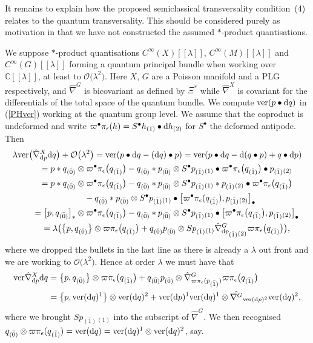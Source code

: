 \documentclass[pdftex]{sigma}
\numberwithin{equation}{section}
\newcommand{\C}{{\mathbb{C}}}
\newcommand{\<}{{\langle}}
\renewcommand{\>}{{\rangle}}
\newcommand{\tens}{\otimes}
\renewcommand{\o}{{}_{\scriptstyle(1)}}
\renewcommand{\t}{{}_{\scriptstyle(2)}}
\newcommand{\extd}{{\rm d}}
\newcommand{\eps}{\epsilon}
\newcommand{\co}{{}_{\scriptstyle \bar{(1)}}}
\newcommand{\rz}{{}_{\scriptstyle \bar{(0)}}}
\begin{document}
It remains to explain how the proposed semiclassical transversality condition~(4) relates to the quantum transversality. This should be considered purely as motivation in that we have not constructed the assumed $*$-product quantisations.

\begin{Remark}\label{defbunrem} We suppose $*$-product quantisations $C^\infty(X)[[\lambda]]$, $C^\infty(M)[[\lambda]]$ and $C^\infty(G)[[\lambda]]$ forming a quantum principal bundle when working over $\C[[\lambda]]$, at least to $\mathcal{O}\big(\lambda^2\big)$. Here $X$, $G$ are a Poisson manifold and a PLG respectively, and $\hat\nabla^G$ is bicovariant as defined by $\Xi^*$ while $\hat\nabla^X$ is covariant for the differentials of the total space of the quantum bundle. We compute $\text{ver}(p\bullet\extd q)$ in (\ref{PHver}) working at the quantum group level. We assume that the coproduct is undeformed and write $\varpi^\bullet\pi_\eps(h)=S^\bullet h\o\bullet \extd h\t$ for $S^\bullet$ the deformed antipode. Then
\begin{gather*} \lambda\text{ver}\big(\hat{\nabla}^X_{\extd p}\extd q\big) +\mathcal{O}\big(\lambda^2\big)=\text{ver}(p\bullet\extd q-(\extd q)\bullet p)=\text{ver}(p\bullet\extd q-\extd(q\bullet p)+q\bullet \extd p)\\
\qquad{} = p* q\rz \tens \varpi^\bullet\pi_\eps\big(q\co\big)-q\rz * p\rz \tens S^\bullet p\co\o \bullet \varpi^\bullet\pi_\eps\big(q\co\big)\bullet p\co\t \\
\qquad{} = p* q\rz \tens \varpi^\bullet\pi_\eps\big(q\co\big)-q\rz * p\rz \tens S^\bullet p\co\o * p\co\t\bullet \varpi^\bullet\pi_\eps\big(q\co\big) \\
\qquad\quad{} -q\rz * p\rz \tens S^\bullet p\co\o \bullet\big[ \varpi^\bullet\pi_\eps(q\co),p\co\t\big]_\bullet\\
\qquad{} = \big[p,q\rz\big]_*\tens \varpi^\bullet\pi_\eps\big(q\co\big) -q\rz * p\rz \tens S^\bullet p\co\o \bullet\big[ \varpi^\bullet\pi_\eps\big(q\co\big),p\co\t\big]_\bullet\\
\qquad{} = \lambda\big(\big\{p,q\rz\big\}\tens \varpi\pi_\eps\big(q\co\big) +q\rz p\rz \tens S p\co\o \hat\nabla^G_{{\rm d}p\co\t} \varpi\pi_\eps\big(q\co\big)\big),
\end{gather*}
where we dropped the bullets in the last line as there is already a $\lambda$ out front and we are working to $\mathcal{O}\big(\lambda^2\big)$. Hence at order $\lambda$ we must have that
\begin{align*}
\text{ver}\hat{\nabla}^X_{\extd p}\extd q&=\big\{p,q\rz\big\}\tens \varpi\pi_\eps\big(q\co\big) +q\rz p\rz \tens \hat\nabla^G_{\varpi\pi_\eps(p\co)} \varpi\pi_\eps\big(q\co\big)\\
& =\big\lbrace p, \text{ver}(\extd q)^1\big\rbrace\tens\text{ver}(\extd q)^2+\text{ver}(\extd p)^1\text{ver}(\extd q)^1\tens \hat{\nabla^G}_{\text{ver}(\extd p)^2}\text{ver}(\extd q)^2,
\end{align*}
where we brought $Sp\co\o$ into the subscript of $\hat\nabla^G$. We then recognised $q\rz\tens\varpi\pi_\eps(q\co)=\text{ver}(\extd q)=\text{ver}(\extd q)^1\tens\text{ver}(\extd q)^2$, say.


\end{Remark}
\end{document}
